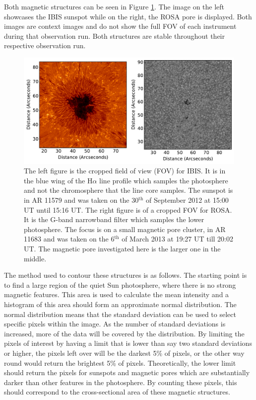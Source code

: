     Both magnetic structures can be seen in Figure \ref{fig:data_overview}.
    The image on the left showcases the  IBIS sunspot while on the right, the ROSA pore is displayed.
    Both images are context images and do not show the full FOV of each instrument during that observation run.
    Both structures are stable throughout their respective observation run.

    \begin{figure}
        \centering
        \includegraphics[width=\textwidth]{overview.pdf}
        \caption{
                The left figure is the cropped field of view (FOV) for IBIS.
                It is in the blue wing of the H$\alpha$ line profile which samples the photosphere and not the chromosphere that the line core samples.
                The sunspot is in AR 11579 and was taken on the 30$^{\mathrm{th}}$ of September 2012 at 15:00 UT until 15:16 UT.
                The right figure is of a cropped FOV for ROSA.
                It is the G-band narrowband filter which samples the lower photosphere.
                The focus is on a small magnetic pore cluster, in AR 11683 and was taken on the 6$^{\mathrm{th}}$ of March 2013 at 19:27 UT till 20:02 UT.
                The magnetic pore investigated here is the larger one in the middle.
                }
        \label{fig:data_overview}
    \end{figure}
        
    The method used to contour these structures is as follows.
    The starting point is to find a large region of the quiet Sun photosphere, where there is no strong magnetic features.
    This area is used to calculate the mean intensity and a histogram of this area should form an approximate normal distribution.
    The normal distribution means that the standard deviation can be used to select specific pixels within the image.
    As the number of standard deviations is increased, more of the data will be covered by the distribution.
    By limiting the pixels of interest by having a limit that is lower than say two standard deviations or higher, the pixels left over will be the darkest 5\% of pixels, or the other way round would return the brightest 5\% of pixels.
    Theoretically, the lower limit should return the pixels for sunspots and magnetic pores which are substantially darker than other features in the photosphere.
    By counting these pixels, this should correspond to the cross-sectional area of these magnetic structures.
    
